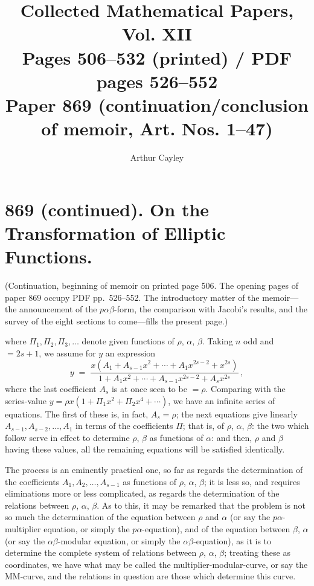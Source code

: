 \documentclass[11pt]{article}
\title{Collected Mathematical Papers, Vol. XII\\ \large Pages 506--532 (printed) / PDF pages 526--552\\ Paper 869 (continuation/conclusion of memoir, Art. Nos. 1--47)}
\author{Arthur Cayley}
\date{}
\begin{document}
\maketitle

\section*{869 (continued). On the Transformation of Elliptic Functions.}

\noindent (Continuation, beginning of memoir on printed page 506. The opening pages of paper 869 occupy PDF pp.\ 526--552. The introductory matter of the memoir---the announcement of the $p\alpha\beta$-form, the comparison with Jacobi's results, and the survey of the eight sections to come---fills the present page.)

\medskip

\noindent where $\Pi_1,\Pi_2,\Pi_3,\ldots$ denote given functions of $\rho$, $\alpha$, $\beta$. Taking $n$ odd and $=2s+1$, we assume for $y$ an expression
\[
y \;=\; \frac{x(A_1 + A_{s-1}x^2 + \cdots + A_1 x^{2s-2} + x^{2s})}{1 + A_1 x^2 + \cdots + A_{s-1} x^{2s-2} + A_s x^{2s}}\,,
\]
where the last coefficient $A_s$ is at once seen to be $=\rho$. Comparing with the series-value $y = \rho x(1 + \Pi_1 x^2 + \Pi_2 x^4 + \cdots)$, we have an infinite series of equations. The first of these is, in fact, $A_s = \rho$; the next equations give linearly $A_{s-1}, A_{s-2}, \ldots, A_1$ in terms of the coefficients $\Pi$; that is, of $\rho$, $\alpha$, $\beta$: the two which follow serve in effect to determine $\rho$, $\beta$ as functions of $\alpha$: and then, $\rho$ and $\beta$ having these values, all the remaining equations will be satisfied identically.

\medskip

\noindent The process is an eminently practical one, so far as regards the determination of the coefficients $A_1, A_2, \ldots, A_{s-1}$ as functions of $\rho$, $\alpha$, $\beta$; it is less so, and requires eliminations more or less complicated, as regards the determination of the relations between $\rho$, $\alpha$, $\beta$. As to this, it may be remarked that the problem is not so much the determination of the equation between $\rho$ and $\alpha$ (or say the $p\alpha$-multiplier equation, or simply the $p\alpha$-equation), and of the equation between $\beta$, $\alpha$ (or say the $\alpha\beta$-modular equation, or simply the $\alpha\beta$-equation), as it is to determine the complete system of relations between $\rho$, $\alpha$, $\beta$; treating these as coordinates, we have what may be called the multiplier-modular-curve, or say the MM-curve, and the relations in question are those which determine this curve.
\end{document}
